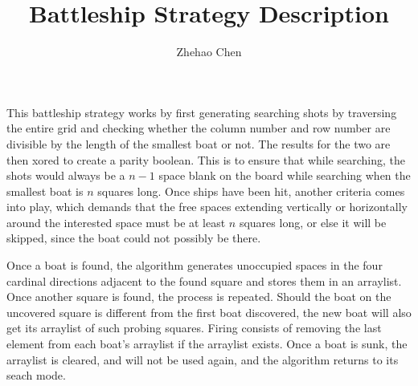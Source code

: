 \documentclass[11pt]{article}
\author{Zhehao Chen}
\title{Battleship Strategy Description}
\begin{document}
This battleship strategy works by first generating searching shots by traversing the entire grid and checking whether the column number and row number are divisible by the length of the smallest boat or not. The results for the two are then xored to create a parity boolean. This is to ensure that while searching, the shots would always be a $n-1$ space blank on the board while searching when the smallest boat is $n$ squares long. Once ships have been hit, another criteria comes into play, which demands that the free spaces extending vertically or horizontally around the interested space must be at least $n$ squares long, or else it will be skipped, since the boat could not possibly be there.

Once a boat is found, the algorithm generates unoccupied spaces in the four cardinal directions adjacent to the found square and stores them in an arraylist. Once another square is found, the process is repeated. Should the boat on the uncovered square is different from the first boat discovered, the new boat will also get its arraylist of such probing squares. Firing consists of removing the last element from each boat's arraylist if the arraylist exists. Once a boat is sunk, the arraylist is cleared, and will not be used again, and the algorithm returns to its seach mode.
\end{document}

